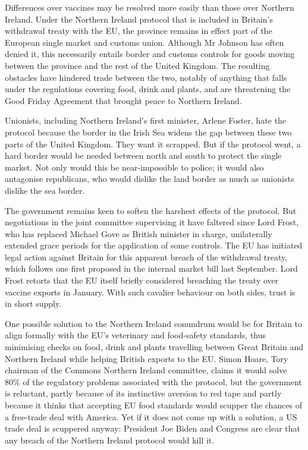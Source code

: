 \documentclass{article}
\begin{document}
Differences over vaccines may be resolved more easily than those over Northern Ireland. Under the Northern Ireland protocol that is included in Britain's withdrawal treaty with the EU, the province remains in effect part of the European single market and customs union. Although Mr Johnson has often denied it, this necessarily entails border and customs controls for goods moving between the province and the rest of the United Kingdom. The resulting obstacles have hindered trade between the two, notably of anything that falls under the regulations covering food, drink and plants, and are threatening the Good Friday Agreement that brought peace to Northern Ireland. 

Unionists, including Northern Ireland's first minister, Arlene Foster, hate the protocol because the border in the Irish Sea widens the gap between these two parts of the United Kingdom. They want it scrapped. But if the protocol went, a hard border would be needed between north and south to protect the single market. Not only would this be near-impossible to police; it would also antagonise republicans, who would dislike the land border as much as unionists dislike the sea border. 

The government remains keen to soften the harshest effects of the protocol. But negotiations in the joint committee supervising it have faltered since Lord Frost, who has replaced Michael Gove as British minister in charge, unilaterally extended grace periods for the application of some controls. The EU has initiated legal action against Britain for this apparent breach of the withdrawal treaty, which follows one first proposed in the internal market bill last September. Lord Frost retorts that the EU itself briefly considered breaching the treaty over vaccine exports in January. With such cavalier behaviour on both sides, trust is in short supply. 

One possible solution to the Northern Ireland conundrum would be for Britain to align formally with the EU's veterinary and food-safety standards, thus minimising checks on food, drink and plants travelling between Great Britain and Northern Ireland while helping British exports to the EU. Simon Hoare, Tory chairman of the Commons Northern Ireland committee, claims it would solve 80\% of the regulatory problems associated with the protocol, but the government is reluctant, partly because of its instinctive aversion to red tape and partly because it thinks that accepting EU food standards would scupper the chances of a free-trade deal with America. Yet if it does not come up with a solution, a US trade deal is scuppered anyway: President Joe Biden and Congress are clear that any breach of the Northern Ireland protocol would kill it. 
\end{document}
